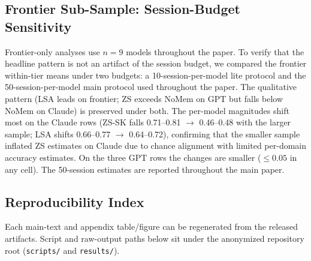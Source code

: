\documentclass[11pt]{article}
\begin{document}
\subsection{Frontier Sub-Sample: Session-Budget Sensitivity}
\label{app:frontier_pending}

Frontier-only analyses use $n{=}9$ models throughout the paper. To verify that the headline pattern is not an artifact of the session budget, we compared the frontier within-tier means under two budgets: a 10-session-per-model lite protocol and the 50-session-per-model main protocol used throughout the paper. The qualitative pattern (LSA leads on frontier; ZS exceeds NoMem on GPT but falls below NoMem on Claude) is preserved under both. The per-model magnitudes shift most on the Claude rows (ZS-SK falls 0.71--0.81 $\to$ 0.46--0.48 with the larger sample; LSA shifts 0.66--0.77 $\to$ 0.64--0.72), confirming that the smaller sample inflated ZS estimates on Claude due to chance alignment with limited per-domain accuracy estimates. On the three GPT rows the changes are smaller ($\le 0.05$ in any cell). The 50-session estimates are reported throughout the main paper.


\subsection{Reproducibility Index}
\label{app:repro_index}

Each main-text and appendix table/figure can be regenerated from the released artifacts. Script and raw-output paths below sit under the anonymized repository root (\texttt{scripts/} and \texttt{results/}).
\end{document}
